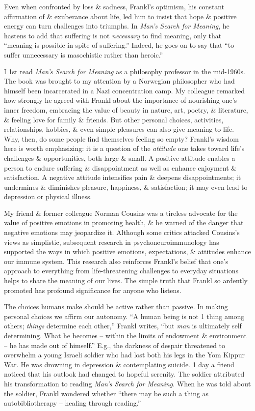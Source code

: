 \documentclass{article}
\numberwithin{equation}{section}
\begin{document}
Even when confronted by loss \& sadness, Frankl's optimism, his constant affirmation of \& exuberance about life, led him to insist that hope \& positive energy can turn challenges into triumphs. In \textit{Man's Search for Meaning}, he hastens to add that suffering is not \textit{necessary} to find meaning, only that ``meaning is possible in spite of suffering.'' Indeed, he goes on to say that ``to suffer unnecessary is masochistic rather than heroic.''

I 1st read \textit{Man's Search for Meaning} as a philosophy professor in the mid-1960s. The book was brought to my attention by a Norwegian philosopher who had himself been incarcerated in a Nazi concentration camp. My colleague remarked how strongly he agreed with Frankl about the importance of nourishing one's inner freedom, embracing the value of beauty in nature, art, poetry, \& literature, \& feeling love for family \& friends. But other personal choices, activities, relationships, hobbies, \& even simple pleasures can also give meaning to life. Why, then, do some people find themselves feeling so empty? Frankl's wisdom here is worth emphasizing: it is a question of the \textit{attitude} one takes toward life's challenges \& opportunities, both large \& small. A positive attitude enables a person to endure suffering \& disappointment as well as enhance enjoyment \& satisfaction. A negative attitude intensifies pain \& deepens disappointments; it undermines \& diminishes pleasure, happiness, \& satisfaction; it may even lead to depression or physical illness.

My friend \& former colleague Norman Cousins was a tireless advocate for the value of positive emotions in promoting health, \& he warned of the danger that negative emotions may jeopardize it. Although some critics attacked Cousins's views as simplistic, subsequent research in psychoneuroimmunology has supported the ways in which positive emotions, expectations, \& attitudes enhance our immune system. This research also reinforces Frankl's belief that one's approach to everything from life-threatening challenges to everyday situations helps to share the meaning of our lives. The simple truth that Frankl so ardently promoted has profound significance for anyone who listens.

The choices humans make should be active rather than passive. In making personal choices we affirm our autonomy. ``A human being is not 1 thing among others; \textit{things} determine each other,'' Frankl writes, ``but \textit{man} is ultimately self determining. What he becomes -- within the limits of endowment \& environment -- he has made out of himself.'' E.g., the darkness of despair threatened to overwhelm a young Israeli soldier who had lost both his legs in the Yom Kippur War. He was drowning in depression \& contemplating suicide. 1 day a friend noticed that his outlook had changed to hopeful serenity. The soldier attributed his transformation to reading \textit{Man's Search for Meaning}. When he was  told about the soldier, Frankl wondered whether ``there may be such a thing as autobibliotherapy -- healing through reading.''
\end{document}
